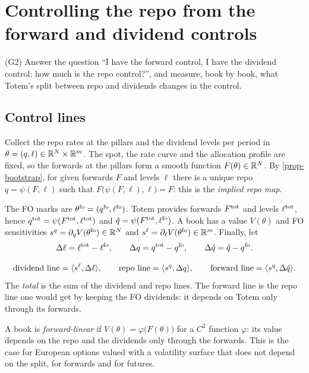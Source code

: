 \section{Controlling the repo from the forward and dividend controls}\label{sec-control}

\begin{objectif}
(G2) Answer the question ``I have the forward control, I have the dividend control: how much is the repo control?'',
and measure, book by book, what Totem's split between repo and dividends changes in the control.
\end{objectif}

\subsection{Control lines}
Collect the repo rates at the pillars and the dividend levels per period in $\theta=(q, \ell)\in\mathbb{R}^N\times\mathbb{R}^m$. The
spot, the rate curve and the allocation profile are fixed, so the forwards at the pillars form a smooth function
$F(\theta)\in\mathbb{R}^N$. By \cref{prop-bootstrap}, for given forwards $F$ and levels $\ell$ there is a unique repo
$q=\psi(F, \ell)$ such that $F\bigl(\psi(F, \ell), \ell\bigr)=F$: this is the \emph{implied repo map}.

The FO marks are $\theta^{\mathrm{fo}}=(q^{\mathrm{fo}}, \ell^{\mathrm{fo}})$. Totem provides forwards $F^{\mathrm{tot}}$ and levels $\ell^{\mathrm{tot}}$,
hence $q^{\mathrm{tot}}=\psi(F^{\mathrm{tot}}, \ell^{\mathrm{tot}})$ and $\hat q=\psi(F^{\mathrm{tot}}, \ell^{\mathrm{fo}})$. A book has a value $V(\theta)$ and
FO sensitivities $s^q=\partial_qV(\theta^{\mathrm{fo}})\in\mathbb{R}^N$ and $s^\ell=\partial_\ell V(\theta^{\mathrm{fo}})\in\mathbb{R}^m$. Finally,
let
\[
\Delta\ell=\ell^{\mathrm{tot}}-\ell^{\mathrm{fo}}, \qquad\Delta q=q^{\mathrm{tot}}-q^{\mathrm{fo}}, \qquad\Delta\hat q=\hat q-q^{\mathrm{fo}}.
\]

\begin{definition}\label{def-lines}
\[
\text{dividend line}=\langle s^\ell, \Delta\ell\rangle, \qquad\text{repo line}=\langle s^q, \Delta q\rangle, \qquad
\text{forward line}=\langle s^q, \Delta\hat q\rangle.
\]
The \emph{total} is the sum of the dividend and repo lines. The forward line is the repo line one would get by keeping
the FO dividends: it depends on Totem only through its forwards.
\end{definition}

\begin{definition}\label{def-fwdlinear}
A book is \emph{forward-linear} if $V(\theta)=\varphi\bigl(F(\theta)\bigr)$ for a $C^2$ function $\varphi$: its value
depends on the repo and the dividends only through the forwards. This is the case for European options valued with a
volatility surface that does not depend on the split, for forwards and for futures.
\end{definition}


